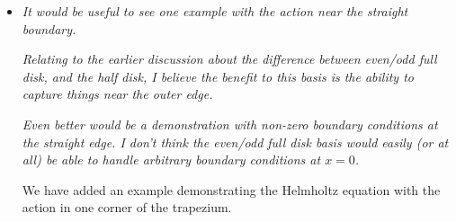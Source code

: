 \documentclass[10pt]{letter}
\newcommand{\comment}[1]{\textit{\color{bluey}#1}}
\begin{document}
\begin{itemize}[parsep=1em,leftmargin=1em]
\item \comment{It would be useful to see one example with the action near the straight boundary. }

\comment{Relating to the earlier discussion about the difference between even/odd full disk, and the half disk, I believe the benefit to this basis is the ability to capture things near the outer edge. }

\comment{Even better would be a demonstration with non-zero boundary conditions at the straight edge. I don't think the even/odd full disk basis would easily (or at all) be able to handle arbitrary boundary conditions at $x=0$.}

We have added an example demonstrating the Helmholtz equation with the action in one corner of the trapezium.


\end{itemize}
\end{document}
